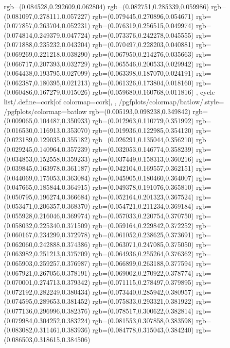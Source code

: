 {{{			rgb=(0.084528,0.292609,0.062804)
			rgb=(0.082751,0.285339,0.059986)
			rgb=(0.081097,0.278111,0.057227)
			rgb=(0.079445,0.270896,0.054671)
			rgb=(0.077857,0.263704,0.052231)
			rgb=(0.076319,0.256515,0.049974)
			rgb=(0.074814,0.249379,0.047724)
			rgb=(0.073376,0.242278,0.045555)
			rgb=(0.071888,0.235232,0.043204)
			rgb=(0.070497,0.228203,0.040881)
			rgb=(0.069269,0.221218,0.038290)
			rgb=(0.067950,0.214276,0.035663)
			rgb=(0.066717,0.207393,0.032729)
			rgb=(0.065546,0.200533,0.029942)
			rgb=(0.064438,0.193795,0.027099)
			rgb=(0.063398,0.187070,0.024191)
			rgb=(0.062387,0.180395,0.021213)
			rgb=(0.061326,0.173804,0.018160)
			rgb=(0.060486,0.167279,0.015026)
			rgb=(0.059680,0.160768,0.011816)
		},
	cycle list/.define={cork}{[of colormap=cork]},
	},
	/pgfplots/colormap/batlow/.style={
		/pgfplots/colormap={batlow}{%
			rgb=(0.005193,0.098238,0.349842)
			rgb=(0.009065,0.104487,0.350933)
			rgb=(0.012963,0.110779,0.351992)
			rgb=(0.016530,0.116913,0.353070)
			rgb=(0.019936,0.122985,0.354120)
			rgb=(0.023189,0.129035,0.355182)
			rgb=(0.026291,0.135044,0.356210)
			rgb=(0.029245,0.140964,0.357239)
			rgb=(0.032053,0.146774,0.358239)
			rgb=(0.034853,0.152558,0.359233)
			rgb=(0.037449,0.158313,0.360216)
			rgb=(0.039845,0.163978,0.361187)
			rgb=(0.042104,0.169557,0.362151)
			rgb=(0.044069,0.175053,0.363084)
			rgb=(0.045905,0.180460,0.364007)
			rgb=(0.047665,0.185844,0.364915)
			rgb=(0.049378,0.191076,0.365810)
			rgb=(0.050795,0.196274,0.366684)
			rgb=(0.052164,0.201323,0.367524)
			rgb=(0.053471,0.206357,0.368370)
			rgb=(0.054721,0.211234,0.369184)
			rgb=(0.055928,0.216046,0.369974)
			rgb=(0.057033,0.220754,0.370750)
			rgb=(0.058032,0.225340,0.371509)
			rgb=(0.059164,0.229842,0.372252)
			rgb=(0.060167,0.234299,0.372978)
			rgb=(0.061052,0.238625,0.373691)
			rgb=(0.062060,0.242888,0.374386)
			rgb=(0.063071,0.247085,0.375050)
			rgb=(0.063982,0.251213,0.375709)
			rgb=(0.064936,0.255264,0.376362)
			rgb=(0.065903,0.259257,0.376987)
			rgb=(0.066899,0.263188,0.377594)
			rgb=(0.067921,0.267056,0.378191)
			rgb=(0.069002,0.270922,0.378774)
			rgb=(0.070001,0.274713,0.379342)
			rgb=(0.071115,0.278497,0.379895)
			rgb=(0.072192,0.282249,0.380434)
			rgb=(0.073440,0.285942,0.380957)
			rgb=(0.074595,0.289653,0.381452)
			rgb=(0.075833,0.293321,0.381922)
			rgb=(0.077136,0.296996,0.382376)
			rgb=(0.078517,0.300622,0.382814)
			rgb=(0.079984,0.304252,0.383224)
			rgb=(0.081553,0.307858,0.383598)
			rgb=(0.083082,0.311461,0.383936)
			rgb=(0.084778,0.315043,0.384240)
			rgb=(0.086503,0.318615,0.384506)
}}}
